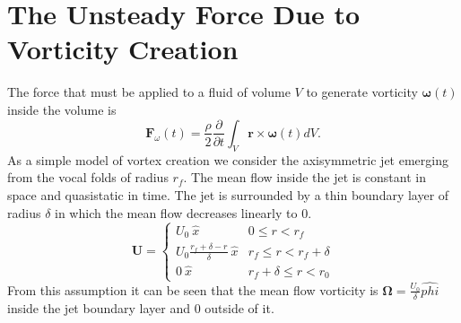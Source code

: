 \documentclass[superscriptaddress, onecolumn, prl]{revtex4}
\begin{document}
\section{The Unsteady Force Due to Vorticity Creation}
The force that must be applied to a fluid of volume $V$ to generate vorticity $\boldsymbol{\omega}(t)$ inside the volume is 
\begin{equation}
\textbf{F}_{\omega}(t) = \frac{\rho}{2} \frac{\partial}{\partial t} \int_V \textbf{r} \times \boldsymbol{\omega}(t) dV.
\end{equation}
As a simple model of vortex creation we consider the axisymmetric jet emerging from the vocal folds of radius $r_f$. The mean flow inside the jet is constant in space and quasistatic in time. The jet is surrounded by a thin boundary layer of radius $\delta$ in which the mean flow decreases linearly to $0$.
\begin{equation}
\textbf{U} = \begin{cases}
U_0\ \hat{x} & 0 \leq r < r_f \\ 
U_0\frac{r_f + \delta - r}{\delta}\ \hat{x} & r_f \leq r < r_f + \delta \\
0\ \hat{x} & r_f + \delta \leq r < r_0
\end{cases}
\end{equation}
From this assumption it can be seen that the mean flow vorticity is $\boldsymbol{\Omega} = \frac{U_0}{\delta} \hat{phi}$ inside the jet boundary layer and $0$ outside of it. 
\end{document}
